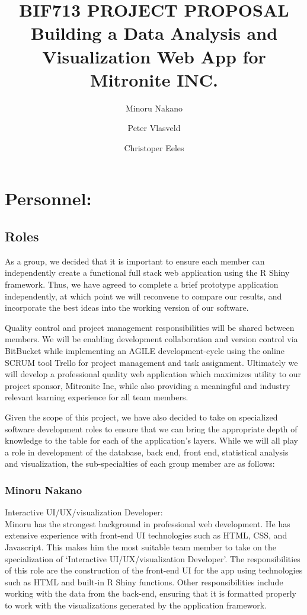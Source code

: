 \documentclass[10pt,twocolumn,letterpaper]{article}
\title{
		\usefont{OT1}{bch}{b}{n}
		\normalfont \normalsize \textsc{BIF713 PROJECT PROPOSAL} \\ [14pt]
		\huge Building a Data Analysis and Visualization Web App for Mitronite INC. \\
}
\author{Minoru Nakano}
\author{Peter Vlasveld}
\author{Christoper Eeles}
\begin{document}
\maketitle


\section{Personnel:}

            \subsection{Roles}

            As a group, we decided that it is important to ensure each member can independently create a functional full stack web application using the R Shiny framework.
	    Thus, we have agreed to complete a brief prototype application independently, at which point we will reconvene to compare our results, and incorporate the best
	    ideas into the working version of our software.
		
	Quality control and project management responsibilities will be shared between members. 
	We will be enabling development collaboration and version control via BitBucket while implementing an 
	AGILE development-cycle using the online SCRUM tool Trello for project management and task assignment.
        Ultimately we will develop a professional quality web application which maximizes utility to our project sponsor, 
	Mitronite Inc, while also providing a meaningful and industry relevant learning experience for all team members.

            Given the scope of this project, we have also decided to take on specialized software development roles to ensure that we can bring the appropriate depth
	    of knowledge to the table for each of the application's layers.
	    While we will all play a role in development of the database, back end, front end, statistical analysis and visualization, the sub-specialties of each group
	    member are as follows:

                \subsubsection*{Minoru Nakano}

                Interactive UI/UX/visualization Developer:\\

		Minoru has the strongest background in professional web development.
		He has extensive experience with front-end UI technologies such as HTML, CSS, and Javascript.
		This makes him the most suitable team member to take on the specialization of `Interactive UI/UX/visualization Developer'.
		The responsibilities of this role are the construction of the front-end UI for the app using technologies such as HTML and built-in R Shiny functions.
		Other responsibilities include working with the data from the back-end, ensuring that it is formatted properly to work with the visualizations generated 
		by the application framework.
\end{document}
